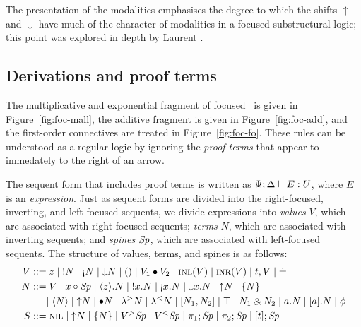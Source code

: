 The presentation of the modalities emphasises the degree to which
the shifts ${\uparrow}$ and ${\downarrow}$ have much of the character
of modalities in a focused substructural logic; this point was
explored in depth by Laurent \cite{laurent02etude}.

\subsection{Derivations and proof terms}
\label{sec:ord-proof-terms}





The multiplicative and exponential fragment of focused \ollll~is given
in Figure~\ref{fig:foc-mall}, the additive fragment is given in
Figure~\ref{fig:foc-add}, and the first-order connectives are treated
in Figure~\ref{fig:foc-fo}. These rules can be understood as a regular
logic by ignoring the {\it proof terms} that appear to immedately to
the right of an arrow.

The sequent form that includes proof terms is written as
${\Psi}; {\Delta} \vdash {E} : {U}$, where $E$ is an {\it expression}.  Just
as sequent forms are divided into the right-focused, inverting, and
left-focused sequents, we divide expressions into {\it values} $V$,
which are associated with right-focused sequents; {\it terms} $N$,
which are associated with inverting sequents; and {\it spines} ${\it Sp}$,
which are associated with left-focused sequents. The structure of
values, terms, and spines is as follows:
\begin{align*}
V & ::= z                     %
   \mid \tbangr{N}            %
   \mid \tgnabr{N}            %
   \mid \tdownr{N}            %
%
   \mid \toner
   \mid \tfuser{V_1}{V_2}     %
%  
   \mid \tinl{V}
   \mid \tinr{V}
   \mid \texistsr{t}{V}
   \mid \tunifr
 \\
N & ::= \tfocusr{V}           %
   \mid \tfocusl{x}{\Sp}      %
   \mid \tetap{z}{N}          %
   \mid \tbangl{x}{N}         %
   \mid \tgnabl{x}{N}         %
   \mid \tdownl{x}{N}         %
   \mid \tupr{N}              %
   \mid \tlaxr{N}             %
\\ & ~~~~ %
   \mid \tetan{N} 
   \mid \tupr{N}
   \mid \tfusel{N}            %
   \mid \tlamr{N}             %
   \mid \tlaml{N}             %
%
   \mid \toplusl{N_1}{N_2}    %
   \mid \ttopr 
   \mid \twithr{N_1}{N_2}     %
   \mid \texistsl{a}{N}
   \mid \tforallr{a}{N}
   \mid \phi
\\
S & ::= \tnil                 %
   \mid \tupl{N}              %
   \mid \tlaxl{N}             %
   \mid \tappr{V}{\Sp}        %
   \mid \tappl{V}{\Sp}        %
   \mid \tpione{\Sp}          %
   \mid \tpitwo{\Sp}          %
   \mid \tforalll{t}{\Sp}
\end{align*}

